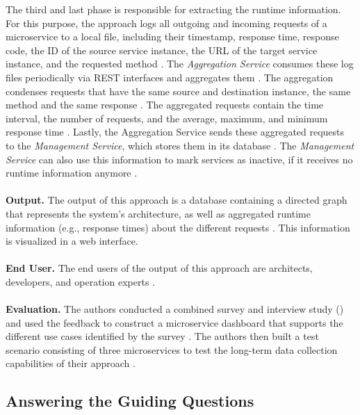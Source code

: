 The third and last phase is responsible for extracting the runtime information.
For this purpose, the approach logs all outgoing and incoming requests of a microservice to a local file, including their timestamp, response time, response code, the ID of the source service instance, the URL of the target service instance, and the requested method \cite{Mayer2018}.
The \textit{Aggregation Service} consumes these log files periodically via REST interfaces and aggregates them \cite{Mayer2018}.
The aggregation condenses requests that have the same source and destination instance, the same method and the same response \cite{Mayer2018}.
The aggregated requests contain the time interval, the number of requests, and the average, maximum, and minimum response time \cite{Mayer2018}.
Lastly, the Aggregation Service sends these aggregated requests to the \textit{Management Service}, which stores them in its database \cite{Mayer2018}.
The \textit{Management Service} can also use this information to mark services as inactive, if it receives no runtime information anymore \cite{Mayer2018}.
\\ \\
\textbf{Output.}
The output of this approach is a database containing a directed graph that represents the system's architecture, as well as aggregated runtime information (e.g., response times) about the different requests \cite{Mayer2018}.
This information is visualized in a web interface.
\\ \\
\textbf{End User.}
The end users of the output of this approach are architects, developers, and operation experts \cite{Mayer2018}.
\\ \\
\textbf{Evaluation.}
The authors conducted a combined survey and interview study (\cite{Mayer2017dashboard}) and used the feedback to construct a microservice dashboard that supports the different use cases identified by the survey \cite{Mayer2018}.
The authors then built a test scenario consisting of three microservices to test the long-term data collection capabilities of their approach \cite{Mayer2018}.


\subsection{Answering the Guiding Questions}
\label{sec:Results:AnsweringRQ}

